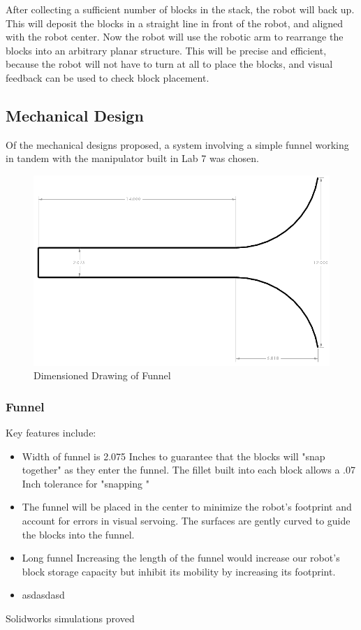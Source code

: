 \documentclass[letterpaper,11pt]{article}
\begin{document}
After collecting a sufficient number of blocks in the stack, the robot will back up.
This will deposit the blocks in a straight line in front of the robot, and aligned with the robot center.
Now the robot will use the robotic arm to rearrange the blocks into an arbitrary planar structure.
This will be precise and efficient, because the robot will not have to turn at all to place the blocks,
and visual feedback can be used to check block placement.

\subsection{Mechanical Design}
Of the mechanical designs proposed, a system involving a simple funnel working in tandem with the manipulator built in Lab 7 was chosen.
\begin{figure}[h]
 \centering
  \includegraphics[width=6.5in]{images/Funnel}
\caption{Dimensioned Drawing of Funnel}
\end{figure}
\subsubsection{Funnel}
Key features include:
\begin{itemize}
\item Width of funnel is 2.075 Inches to guarantee that the blocks will "snap together" as they enter the funnel. The fillet built into each block allows a .07 Inch tolerance for "snapping "
\item The funnel will be placed in the center to minimize the robot's footprint and account for errors in visual servoing. The surfaces are gently curved to guide the blocks into the funnel.
\item Long funnel Increasing the length of the funnel would increase our robot's block storage capacity but inhibit its mobility by increasing its footprint.
\item asdasdasd
\end{itemize}
Solidworks simulations proved 
\end{document}

